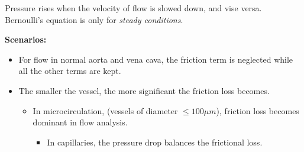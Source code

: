 \documentclass[12pt, a4paper]{article}
\theoremstyle{definition}
\theoremstyle{remark}
\theoremstyle{definition}
\newcommand{\?}{\stackrel{?}{=}}
\renewcommand{\bf}[1]{\textbf{#1}}
\renewcommand{\it}[1]{\textit{#1}}
\begin{document}
Pressure rises when the velocity of flow is slowed down, and vise versa. \\
Bernoulli's equation is only for \it{steady conditions}.

\bf{Scenarios:}
\begin{itemize}
\item For flow in normal aorta and vena cava, the friction term is neglected while all the other terms are kept.
\item The smaller the vessel, the more significant the friction loss becomes.
	\begin{itemize}
	\item In microcirculation, (vessels of diameter $\leq 100 \mu m$), friction loss becomes dominant in flow analysis. 
		\begin{itemize}
		\item In capillaries, the pressure drop balances the frictional loss. 
		\end{itemize}
	\end{itemize}
\end{itemize}
\end{document}
